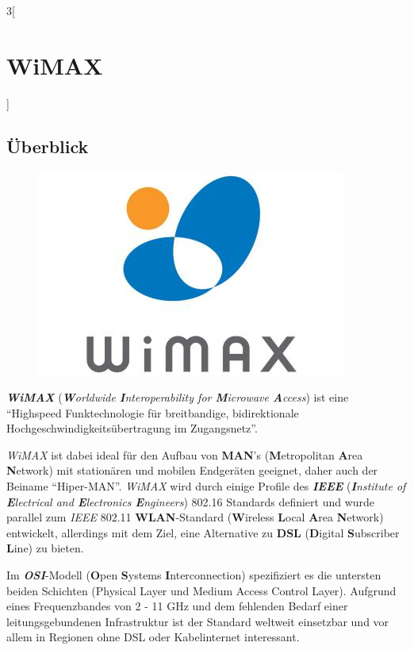 \begin{multicols}{3}[\section{WiMAX}]
\subsection*{Überblick}
\begin{figure}
  \vspace{-20pt}
  \begin{center}
  	\hspace{-20pt}
    \includegraphics[width=0.7\linewidth]{Kapitel/WiMAX/Grafiken/wmx_logo.jpg}
  \end{center}
  \vspace{-15pt}
\end{figure}

\textit{\textbf{WiMAX}} (\textit{\textbf{W}orldwide \textbf{I}nteroperability for \textbf{M}icrowave \textbf{A}ccess}) ist eine \enquote{Highspeed Funktechnologie für breitbandige, bidirektionale Hochgeschwindigkeitsübertragung im Zugangsnetz}.~\cite{wmx.1}

\textit{WiMAX}  ist dabei ideal für den Aufbau von \textbf{MAN}'s (\textbf{M}etropolitan \textbf{A}rea \textbf{N}etwork) mit stationären und mobilen Endgeräten geeignet, daher auch der Beiname \enquote{Hiper-MAN}. \textit{WiMAX} wird durch einige Profile des \textit{\textbf{IEEE}} (\textit{\textbf{I}nstitute of \textbf{E}lectrical and \textbf{E}lectronics \textbf{E}ngineers}) 802.16 Standards definiert und wurde parallel zum \textit{IEEE} 802.11 \textbf{WLAN}-Standard (\textbf{W}ireless \textbf{L}ocal \textbf{A}rea \textbf{N}etwork) entwickelt, allerdings mit dem Ziel, eine Alternative zu \textbf{DSL} (\textbf{D}igital \textbf{S}ubscriber \textbf{L}ine) zu bieten.~\cite{wmx.2}

Im \textit{\textbf{OSI}}-Modell (\textbf{O}pen \textbf{S}ystems \textbf{I}nterconnection) spezifiziert es die untersten beiden Schichten (Physical Layer und Medium Access Control Layer). Aufgrund eines Frequenzbandes von 2 - 11 GHz und dem fehlenden Bedarf einer leitungsgebundenen Infrastruktur ist der Standard weltweit einsetzbar und vor allem in Regionen ohne DSL oder Kabelinternet interessant.~\cite{wmx.4}



\end{multicols}
